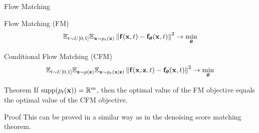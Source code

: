 \documentclass{beamer}
\begin{document}
\begin{frame}{Flow Matching}
	\begin{block}{Flow Matching (FM)}
		\vspace{-0.3cm}
		\[
			\mathbb{E}_{t \sim U[0, 1]} \mathbb{E}_{\mathbf{x} \sim p_t(\mathbf{x})}\left\| \mathbf{f}(\mathbf{x}, t) - \mathbf{f}_{\boldsymbol{\theta}}(\mathbf{x}, t) \right\|^2 \rightarrow \min_{\boldsymbol{\theta}}
		\]
		\vspace{-0.3cm}
	\end{block}
	\begin{block}{Conditional Flow Matching (CFM)}
		\vspace{-0.3cm}
		\[
			\mathbb{E}_{t \sim U[0, 1]} \mathbb{E}_{\mathbf{z} \sim p(\mathbf{z})} \mathbb{E}_{\mathbf{x} \sim p_t(\mathbf{x} | \mathbf{z})}\left\| \mathbf{f}(\mathbf{x}, \mathbf{z}, t) - \mathbf{f}_{\boldsymbol{\theta}}(\mathbf{x}, t) \right\|^2 \rightarrow \min_{\boldsymbol{\theta}}
		\]
		\vspace{-0.3cm}
	\end{block}
    \eqpause
	\begin{block}{Theorem}
		If $\text{supp}(p_t(\mathbf{x})) = \mathbb{R}^m$, then the optimal value of the FM objective equals the optimal value of the CFM objective.
	\end{block}
    \eqpause
	\begin{block}{Proof}
		This can be proved in a similar way as in the denoising score matching theorem.
	\end{block}
\end{frame}
\end{document}

